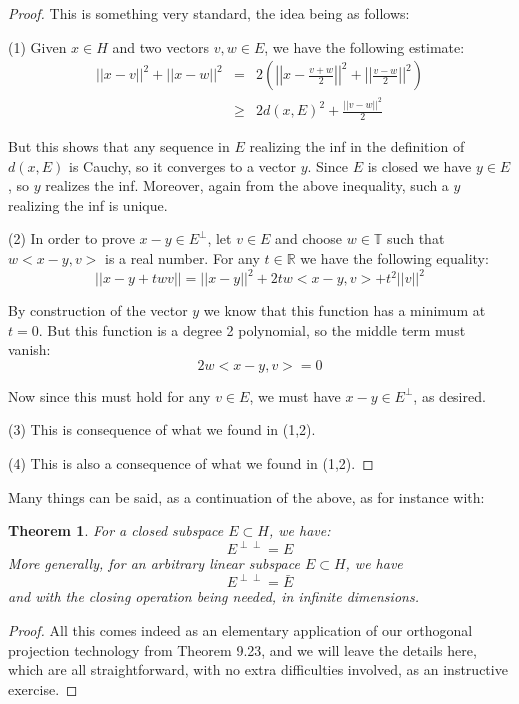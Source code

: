 \documentclass[12pt]{amsbook}
\newtheorem{theorem}{Theorem}[chapter]
\begin{document}
\begin{proof}
This is something very standard, the idea being as follows:

\medskip

(1) Given $x\in H$ and two vectors $v,w\in E$, we have the following estimate:
\begin{eqnarray*}
||x-v||^2+||x-w||^2
&=&2\left(\left|\left|x-\frac{v+w}{2}\right|\right|^2+\left|\left|\frac{v-w}{2}\right|\right|^2\right)\\
&\geq&2d(x,E)^2+\frac{||v-w||^2}{2}
\end{eqnarray*}

But this shows that any sequence in $E$ realizing the inf in the definition of $d(x,E)$ is Cauchy, so it converges to a vector $y$. Since $E$ is closed we have $y\in E$, so $y$ realizes the inf. Moreover, again from the above inequality, such a $y$ realizing the inf is unique.

\medskip

(2) In order to prove $x-y\in E^\perp$, let $v\in E$ and choose $w\in\mathbb T$ such that $w<x-y,v>$ is a real number. For any $t\in\mathbb R$ we have the following equality:
$$||x-y+twv||=||x-y||^2+2tw<x-y,v>+t^2||v||^2$$

By construction of the vector $y$ we know that this function has a minimum at $t=0$. But this function is a degree 2 polynomial, so the middle term must vanish:
$$2w<x-y,v>=0$$

Now since this must hold for any $v\in E$, we must have $x-y\in E^\perp$, as desired.

\medskip

(3) This is consequence of what we found in (1,2).

\medskip

(4) This is also a consequence of what we found in (1,2).
\end{proof}

Many things can be said, as a continuation of the above, as for instance with:

\begin{theorem}
For a closed subspace $E\subset H$, we have:
$$E^{\perp\perp}=E$$
More generally, for an arbitrary linear subspace $E\subset H$, we have
$$E^{\perp\perp}=\bar{E}$$
and with the closing operation being needed, in infinite dimensions.
\end{theorem}

\begin{proof}
All this comes indeed as an elementary application of our orthogonal projection technology from Theorem 9.23, and we will leave the details here, which are all straightforward, with no extra difficulties involved, as an instructive exercise.
\end{proof}
\end{document}
